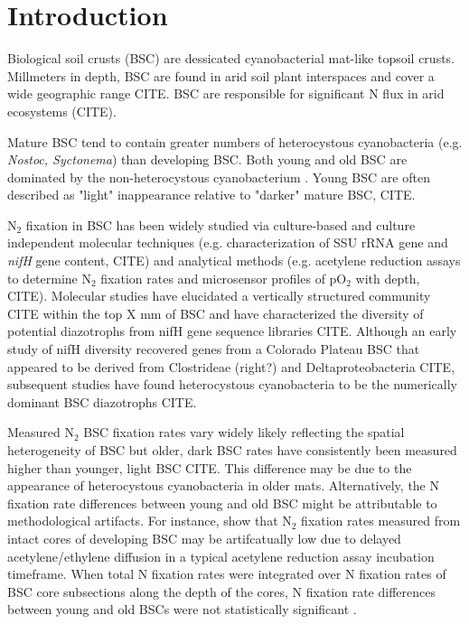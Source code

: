 \section{Introduction}


Biological soil crusts (BSC) are dessicated cyanobacterial mat-like topsoil crusts. Millmeters in depth, BSC are found in arid soil plant interspaces and cover a wide geographic range CITE. BSC are responsible for significant N flux in arid ecosystems (CITE). 

Mature BSC tend to contain greater numbers of heterocystous cyanobacteria (e.g. \textit{Nostoc, Syctonema}) than developing BSC. Both young and old BSC are dominated by the non-heterocystous cyanobacterium . Young BSC are often described as "light" inappearance relative to "darker" mature BSC, CITE.

N$_{2}$ fixation in BSC has been widely studied via culture-based and culture independent molecular techniques (e.g. characterization of SSU rRNA gene and \textit{nifH} gene content, CITE) and analytical methods (e.g. acetylene reduction assays to determine N$_{2}$ fixation rates and microsensor profiles of pO$_{2}$ with depth, CITE). Molecular studies have elucidated a vertically structured community CITE within the top X mm of BSC and have characterized the diversity of potential diazotrophs from nifH gene sequence libraries CITE. Although an early study of nifH diversity recovered genes from a Colorado Plateau BSC that appeared to be derived from Clostrideae (right?) and Deltaproteobacteria CITE, subsequent studies have found heterocystous cyanobacteria to be the numerically dominant BSC diazotrophs CITE. 

Measured N$_{2}$ BSC fixation rates vary widely likely reflecting the spatial heterogeneity of BSC but older, dark BSC rates have consistently been measured higher than younger, light BSC CITE. This difference may be due to the appearance of heterocystous cyanobacteria in older mats. Alternatively, the N fixation rate differences between young and old BSC might be attributable to methodological artifacts. For instance, \citet{15643930} show that N$_{2}$ fixation rates measured from intact cores of developing BSC may be artifcatually low due to delayed acetylene/ethylene diffusion in a typical acetylene reduction assay incubation timeframe. When total N fixation rates were integrated over N fixation rates of BSC core subsections along the depth of the cores, N fixation rate differences between young and old BSCs were not statistically significant \cite{15643930}.

